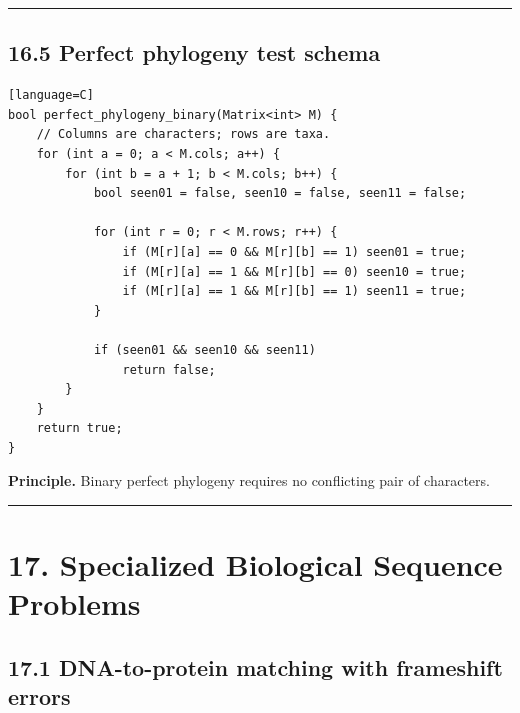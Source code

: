 \documentclass[11pt]{article}
\begin{document}
\begin{center}\rule{0.5\linewidth}{0.5pt}\end{center}

\subsection{16.5 Perfect phylogeny test schema}\label{perfect-phylogeny-test-schema}

\begin{verbatim}[language=C]
bool perfect_phylogeny_binary(Matrix<int> M) {
    // Columns are characters; rows are taxa.
    for (int a = 0; a < M.cols; a++) {
        for (int b = a + 1; b < M.cols; b++) {
            bool seen01 = false, seen10 = false, seen11 = false;

            for (int r = 0; r < M.rows; r++) {
                if (M[r][a] == 0 && M[r][b] == 1) seen01 = true;
                if (M[r][a] == 1 && M[r][b] == 0) seen10 = true;
                if (M[r][a] == 1 && M[r][b] == 1) seen11 = true;
            }

            if (seen01 && seen10 && seen11)
                return false;
        }
    }
    return true;
}
\end{verbatim}

\textbf{Principle.} Binary perfect phylogeny requires no conflicting pair of characters.

\begin{center}\rule{0.5\linewidth}{0.5pt}\end{center}

\section{17. Specialized Biological Sequence Problems}\label{specialized-biological-sequence-problems}

\subsection{17.1 DNA-to-protein matching with frameshift errors}\label{dna-to-protein-matching-with-frameshift-errors}
\end{document}
